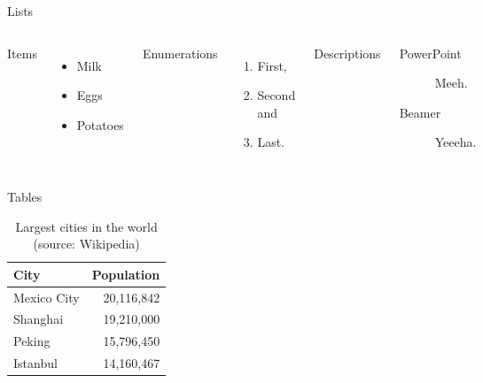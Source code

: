 \begin{frame}{Lists}
	\begin{columns}[T,onlytextwidth]
		Items
		\begin{itemize}
			\item Milk \item Eggs \item Potatoes
		\end{itemize}
		
		Enumerations
		\begin{enumerate}
			\item First, \item Second and \item Last.
		\end{enumerate}
		
		Descriptions
		\begin{description}
			\item[PowerPoint] Meeh. \item[Beamer] Yeeeha.
		\end{description}
	\end{columns}
\end{frame}
\begin{frame}{Tables}
	\begin{table}
		\caption{Largest cities in the world (source: Wikipedia)}
		\begin{tabular}{@{} lr @{}}
			\toprule
			City & Population\\
			\midrule
			Mexico City & 20,116,842\\
			Shanghai & 19,210,000\\
			Peking & 15,796,450\\
			Istanbul & 14,160,467\\
			\bottomrule
		\end{tabular}
	\end{table}
\end{frame}
